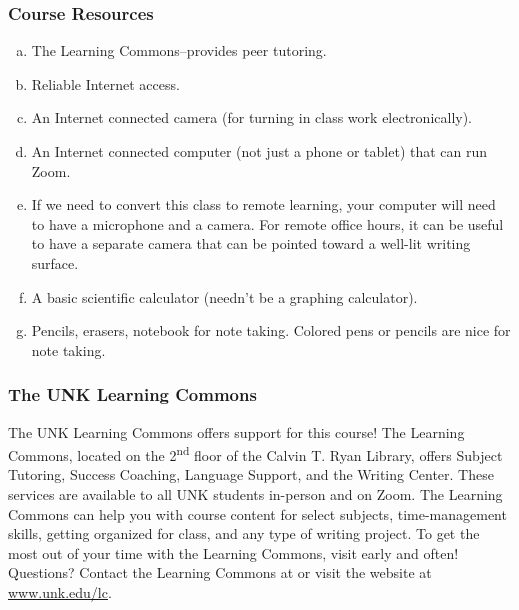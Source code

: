 \documentclass[12pt]{article}
\newcounter{ex}\setcounter{ex}{0}
\newenvironment{alphalist}{
  \begin{enumerate}[(a)]
    \addtolength{\itemsep}{-0.5\itemsep}}
  {\end{enumerate}}
\begin{document}
\newpage

\subsubsection*{Course Resources}

\begin{alphalist}

\item The Learning Commons--provides peer tutoring.

\item Reliable Internet access.

\item An Internet connected camera (for turning in class work electronically).

\item  An Internet connected computer (not just a phone or tablet) that can run Zoom. 

\item If we need to convert this class to remote learning, your computer will need to have a microphone and a camera. For remote office hours, it can be useful to have a separate camera that can be pointed toward a well-lit writing surface.

\item A basic scientific calculator (needn't be a graphing calculator).

\item Pencils, erasers, notebook for note taking. Colored pens or pencils are nice for note taking.

\end{alphalist}

\subsubsection*{The UNK Learning Commons}

The UNK Learning Commons offers support for this course! The Learning Commons, 
located on the 2\textsuperscript{nd} floor of the Calvin T. Ryan Library, offers Subject Tutoring, 
Success Coaching, Language Support, and the Writing Center. These services are 
available to all UNK students in-person and on Zoom. The Learning Commons can 
help you with course content for select subjects, time-management skills, 
getting organized for class, and any type of writing project. To get the most 
out of your time with the Learning Commons, visit early and often! Questions? 
Contact the Learning Commons at  or visit the 
website at \url{www.unk.edu/lc}. 
\end{document}
